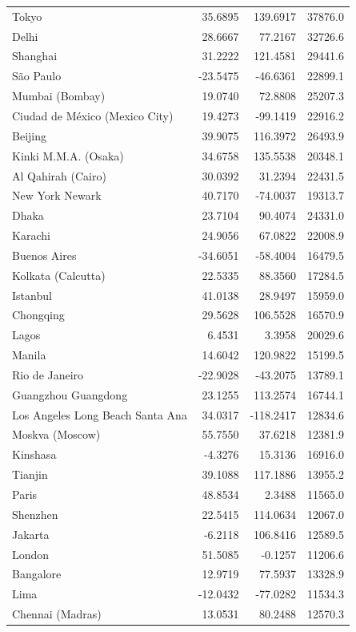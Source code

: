 \begin{longtable}{lrrc}
Tokyo & 35.6895 & 139.6917 & 37876.0 \\
Delhi & 28.6667 & 77.2167 & 32726.6 \\
Shanghai & 31.2222 & 121.4581 & 29441.6 \\
São Paulo & -23.5475 & -46.6361 & 22899.1 \\
Mumbai (Bombay) & 19.0740 & 72.8808 & 25207.3 \\
Ciudad de México (Mexico City) & 19.4273 & -99.1419 & 22916.2 \\
Beijing & 39.9075 & 116.3972 & 26493.9 \\
Kinki M.M.A. (Osaka) & 34.6758 & 135.5538 & 20348.1 \\
Al Qahirah (Cairo) & 30.0392 & 31.2394 & 22431.5 \\
New York Newark & 40.7170 & -74.0037 & 19313.7 \\
Dhaka & 23.7104 & 90.4074 & 24331.0 \\
Karachi & 24.9056 & 67.0822 & 22008.9 \\
Buenos Aires & -34.6051 & -58.4004 & 16479.5 \\
Kolkata (Calcutta) & 22.5335 & 88.3560 & 17284.5 \\
Istanbul & 41.0138 & 28.9497 & 15959.0 \\
Chongqing & 29.5628 & 106.5528 & 16570.9 \\
Lagos & 6.4531 & 3.3958 & 20029.6 \\
Manila & 14.6042 & 120.9822 & 15199.5 \\
Rio de Janeiro & -22.9028 & -43.2075 & 13789.1 \\
Guangzhou  Guangdong & 23.1255 & 113.2574 & 16744.1 \\
Los Angeles Long Beach Santa Ana & 34.0317 & -118.2417 & 12834.6 \\
Moskva (Moscow) & 55.7550 & 37.6218 & 12381.9 \\
Kinshasa & -4.3276 & 15.3136 & 16916.0 \\
Tianjin & 39.1088 & 117.1886 & 13955.2 \\
Paris & 48.8534 & 2.3488 & 11565.0 \\
Shenzhen & 22.5415 & 114.0634 & 12067.0 \\
Jakarta & -6.2118 & 106.8416 & 12589.5 \\
London & 51.5085 & -0.1257 & 11206.6 \\
Bangalore & 12.9719 & 77.5937 & 13328.9 \\
Lima & -12.0432 & -77.0282 & 11534.3 \\
Chennai (Madras) & 13.0531 & 80.2488 & 12570.3 \\

\end{longtable}
